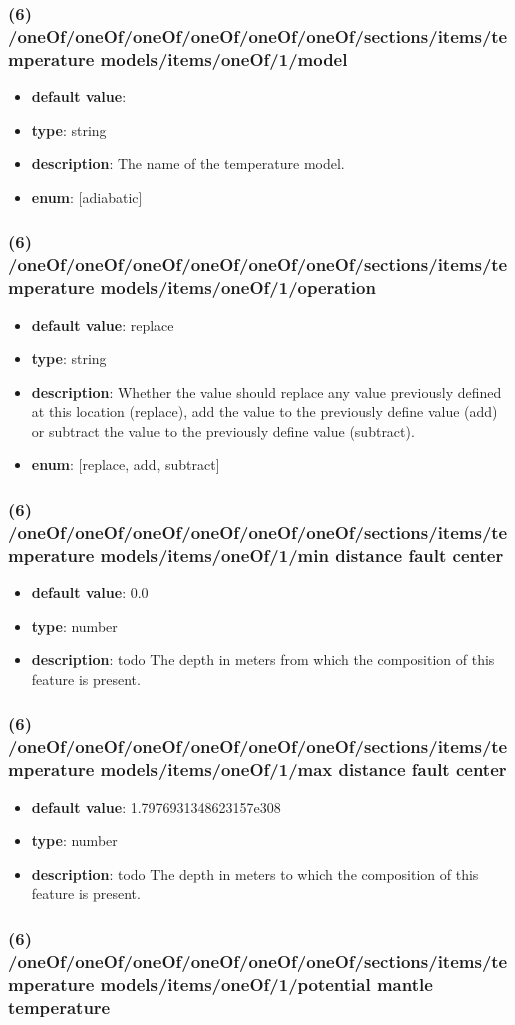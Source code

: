 \subsubsection{(6) /oneOf/oneOf/oneOf/oneOf/oneOf/oneOf/sections/items/temperature models/items/oneOf/1/model}
\begin{itemize}[leftmargin=6em]\item {\bf default value}: 
\item {\bf type}: string
\item {\bf description}: The name of the temperature model.
\item {\bf enum}: [adiabatic]\end{itemize}\subsubsection{(6) /oneOf/oneOf/oneOf/oneOf/oneOf/oneOf/sections/items/temperature models/items/oneOf/1/operation}
\begin{itemize}[leftmargin=6em]\item {\bf default value}: replace
\item {\bf type}: string
\item {\bf description}: Whether the value should replace any value previously defined at this location (replace), add the value to the previously define value (add) or subtract the value to the previously define value (subtract).
\item {\bf enum}: [replace, add, subtract]\end{itemize}\subsubsection{(6) /oneOf/oneOf/oneOf/oneOf/oneOf/oneOf/sections/items/temperature models/items/oneOf/1/min distance fault center}
\begin{itemize}[leftmargin=6em]\item {\bf default value}: 0.0
\item {\bf type}: number
\item {\bf description}: todo The depth in meters from which the composition of this feature is present.
\end{itemize}\subsubsection{(6) /oneOf/oneOf/oneOf/oneOf/oneOf/oneOf/sections/items/temperature models/items/oneOf/1/max distance fault center}
\begin{itemize}[leftmargin=6em]\item {\bf default value}: 1.7976931348623157e308
\item {\bf type}: number
\item {\bf description}: todo The depth in meters to which the composition of this feature is present.
\end{itemize}\subsubsection{(6) /oneOf/oneOf/oneOf/oneOf/oneOf/oneOf/sections/items/temperature models/items/oneOf/1/potential mantle temperature}
